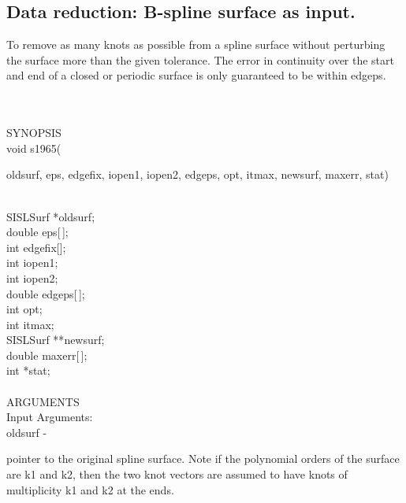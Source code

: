 \subsection{Data reduction: B-spline surface as input.}
\begin{minipg1}
To remove as many knots as possible from a spline surface
           without perturbing the surface more than the given tolerance.
           The error in continuity over the start and end of
           a closed or periodic surface is only guaranteed to be within
           edgeps.
\end{minipg1} \\ \\
SYNOPSIS\\
        \> void s1965(\begin{minipg3}
            {\fov oldsurf},  {\fov eps},  {\fov edgefix},  {\fov iopen1},  {\fov iopen2},  {\fov edgeps},  {\fov opt}, 
	     {\fov itmax},  {\fov newsurf}, {\fov maxerr},  {\fov stat})
                \end{minipg3}\\
                \>\>    SISLSurf \> 	*{\fov oldsurf};\\
                \>\>    double	\> {\fov eps}[\,];\\
                \>\>    int	\> {\fov edgefix}[{}];\\
                \>\>    int    \>  {\fov iopen1};\\
                \>\>    int    \>  {\fov iopen2};\\
                \>\>    double	\> {\fov edgeps}[\,];\\
                \>\>    int 	\> {\fov opt};\\
                \>\>    int	\> {\fov itmax};\\
                \>\>    SISLSurf\> 	**{\fov newsurf};\\
                \>\>    double	\> {\fov maxerr}[\,];\\
                \>\>    int	\> *{\fov stat};\\
\\
ARGUMENTS\\
	\>Input Arguments:\\
        \>\>    {\fov oldsurf}\> - \>  \begin{minipg2}
                     pointer to the original spline surface. Note
			 if the polynomial orders of the surface are
			 k1 and k2, then the two knot vectors are
			 assumed to have knots of multiplicity k1 and
			 k2 at the ends.
                               \end{minipg2}\\[0.8ex]
